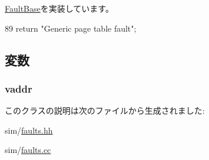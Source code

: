 \hyperlink{classFaultBase_aad960357563b8b969d2dffdcc6861de7}{FaultBase}を実装しています。


\begin{DoxyCode}
89 {return "Generic page table fault";}
\end{DoxyCode}


\subsection{変数}
\hypertarget{classGenericPageTableFault_a9f933b300ef63eea367ca82f8da31025}{
\subsubsection[{vaddr}]{ {\bf vaddr}}}
\label{classGenericPageTableFault_a9f933b300ef63eea367ca82f8da31025}


このクラスの説明は次のファイルから生成されました:\begin{DoxyCompactItemize}
\item 
sim/\hyperlink{sim_2faults_8hh}{faults.hh}\item 
sim/\hyperlink{sim_2faults_8cc}{faults.cc}\end{DoxyCompactItemize}

